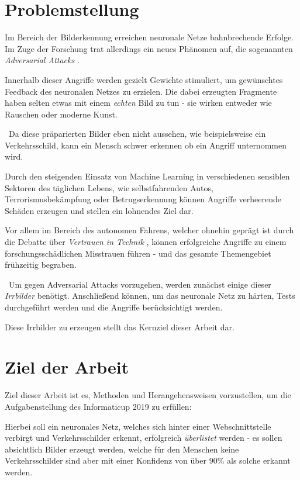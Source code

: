 \section{Problemstellung}
Im Bereich der Bilderkennung erreichen neuronale Netze bahnbrechende Erfolge. Im Zuge der Forschung trat allerdings ein neues Phänomen auf, die sogenannten \textit{Adversarial Attacks} \cite{todo}. 

Innerhalb dieser Angriffe werden gezielt Gewichte stimuliert, um gewünschtes Feedback des neuronalen Netzes zu erzielen. Die dabei erzeugten Fragmente haben selten etwas mit einem \textit{echten} Bild zu tun - sie wirken entweder wie Rauschen oder moderne Kunst. 

~\newline Da diese präparierten Bilder eben nicht aussehen, wie beispielsweise ein Verkehrsschild, kann ein Mensch schwer erkennen ob ein Angriff unternommen wird. 

Durch den steigenden Einsatz von Machine Learning in verschiedenen sensiblen Sektoren des täglichen Lebens, wie selbstfahrenden Autos, Terrorismusbekämpfung oder Betrugserkennung können Angriffe verheerende Schäden erzeugen und stellen ein lohnendes Ziel dar. 

Vor allem im Bereich des autonomen Fahrens, welcher ohnehin geprägt ist durch die Debatte über \textit{Vertrauen in Technik} \cite{todo}, können erfolgreiche Angriffe zu einem forschungsschädlichen Misstrauen führen - und das gesamte Themengebiet frühzeitig begraben. 

~\newline Um gegen Adversarial Attacks vorzugehen, werden zunächst einige dieser \textit{Irrbilder} benötigt. Anschließend können, um das neuronale Netz zu härten, Tests durchgeführt werden und die Angriffe berücksichtigt werden. 

Diese Irrbilder zu erzeugen stellt das Kernziel dieser Arbeit dar. 

\section{Ziel der Arbeit}
\label{sec:ZielDerArbeit}
Ziel dieser Arbeit ist es, Methoden und Herangehensweisen vorzustellen, um die Aufgabenstellung des Informaticup 2019  zu erfüllen: 

Hierbei soll ein neuronales Netz, welches sich hinter einer Webschnittstelle verbirgt und Verkehrsschilder erkennt, erfolgreich \textit{überlistet} werden - es sollen absichtlich Bilder erzeugt werden, welche für den Menschen keine Verkehrsschilder sind aber mit einer Konfidenz von über 90\% als solche erkannt werden. 

